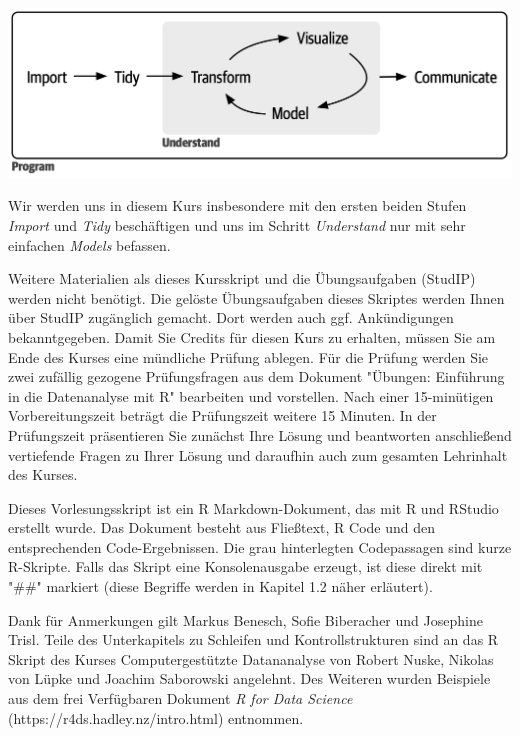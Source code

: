 \begin{titlepage}
\includegraphics{img/data_science_steps.png}

Wir werden uns in diesem Kurs insbesondere mit den ersten beiden Stufen \textit{Import} und \textit{Tidy} beschäftigen und uns im Schritt \textit{Understand} nur mit sehr einfachen \textit{Models} befassen.

Weitere Materialien als dieses Kursskript und die Übungsaufgaben (StudIP) werden nicht benötigt. Die gelöste Übungsaufgaben dieses Skriptes werden Ihnen über StudIP zugänglich gemacht. Dort werden auch ggf. Ankündigungen bekanntgegeben. Damit Sie Credits für diesen Kurs zu erhalten, müssen Sie am Ende des Kurses eine mündliche Prüfung ablegen. Für die Prüfung werden Sie zwei zufällig gezogene Prüfungsfragen aus dem Dokument "Übungen: Einführung in die Datenanalyse mit R" bearbeiten und vorstellen.
Nach einer 15-minütigen Vorbereitungszeit beträgt die Prüfungszeit weitere 15 Minuten. In der Prüfungszeit präsentieren Sie zunächst Ihre Lösung und beantworten anschließend vertiefende Fragen zu Ihrer Lösung und daraufhin auch zum gesamten Lehrinhalt des Kurses.

Dieses Vorlesungsskript ist ein R Markdown-Dokument, das mit R und RStudio erstellt wurde. Das Dokument besteht aus Fließtext, R Code und den entsprechenden Code-Ergebnissen. Die grau hinterlegten Codepassagen sind kurze R-Skripte. Falls das Skript eine Konsolenausgabe erzeugt, ist diese direkt mit "\#\#" markiert (diese Begriffe werden in Kapitel 1.2 näher erläutert).

Dank für Anmerkungen gilt Markus Benesch, Sofie Biberacher und Josephine Trisl.
Teile des Unterkapitels zu Schleifen und Kontrollstrukturen sind an das R Skript des Kurses Computergestützte Datananalyse von Robert Nuske, Nikolas von Lüpke und Joachim Saborowski angelehnt. Des Weiteren wurden Beispiele aus dem frei Verfügbaren Dokument \textit{R for Data Science} (https://r4ds.hadley.nz/intro.html) entnommen.
\end{titlepage}

